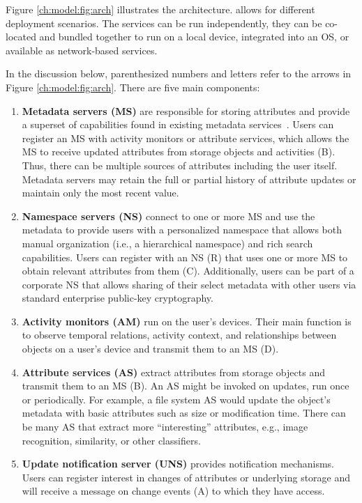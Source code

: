 Figure \ref{ch:model:fig:arch} illustrates the \emph{\system} architecture. \emph{\system} allows for
different deployment scenarios. The services can be run independently, they
can be co-located and bundled together to run on a local device, integrated into
an OS, or available as network-based services.

In the discussion below, parenthesized numbers and letters refer to the arrows
in Figure \ref{ch:model:fig:arch}. There are five main components:

\begin{enumerate}[1)]

    \item \textbf{Metadata servers (MS)} are responsible for storing attributes
          and provide a superset of capabilities found in existing metadata
          services~\cite{federatedMetaData,smartstore}. Users can register an MS with
          activity monitors or attribute services, which allows the MS to receive
          updated attributes from storage objects and activities (B). Thus, there can
          be multiple sources of attributes including the user itself. Metadata
          servers may retain the full or partial history of attribute updates or
          maintain only the most recent value.

    \item \textbf{Namespace servers (NS)}
          connect to one or more MS and use the metadata to provide users with a
          personalized namespace that allows both manual organization (i.e., a
          hierarchical namespace) and rich search capabilities.
          Users can register with an NS (R) that uses one or more MS to obtain relevant
          attributes from them (C). Additionally, users can be part of a corporate NS that
          allows sharing of their select metadata with other users via standard enterprise
          public-key cryptography.

    \item \textbf{Activity monitors (AM)}
          run on the user's devices. Their main function is to observe temporal relations,
          activity context, and relationships between objects on a user's device and
          transmit them to an MS (D).


    \item \textbf{Attribute services (AS)}
          extract attributes from storage objects and transmit them to an MS (B). An AS
          might be invoked on updates, run once or periodically. For example, a file
          system AS would update the object's metadata with basic attributes such as size
          or modification time. There can be many AS that extract more ``interesting''
          attributes, e.g., image recognition, similarity, or other classifiers.

    \item \textbf{Update notification server (UNS)}
          provides notification mechanisms. Users can register interest in changes of
          attributes or underlying storage and will receive a message on change events (A)
          to which they have access.

\end{enumerate}

